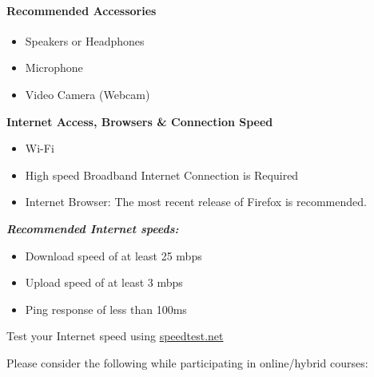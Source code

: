 \documentclass[
]{book}
\providecommand{\tightlist}{%
  \setlength{\itemsep}{0pt}\setlength{\parskip}{0pt}}
\theoremstyle{definition}
\theoremstyle{definition}
\theoremstyle{definition}
\theoremstyle{definition}
\theoremstyle{remark}
\begin{document}
\hypertarget{recommended-accessories}{%
\paragraph*{Recommended Accessories}\label{recommended-accessories}}

\begin{itemize}
\tightlist
\item
  Speakers or Headphones
\item
  Microphone\\
\item
  Video Camera (Webcam)
\end{itemize}

\textbf{Internet Access, Browsers \& Connection Speed}

\begin{itemize}
\tightlist
\item
  Wi-Fi\\
\item
  High speed Broadband Internet Connection is Required\\
\item
  Internet Browser: The most recent release of Firefox is recommended.
\end{itemize}

\textbf{\emph{Recommended Internet speeds:}}

\begin{itemize}
\tightlist
\item
  Download speed of at least 25 mbps\\
\item
  Upload speed of at least 3 mbps\\
\item
  Ping response of less than 100ms
\end{itemize}

\begin{feedback}
Test your Internet speed using \url{speedtest.net}
\end{feedback}

Please consider the following while participating in online/hybrid courses:
\end{document}
